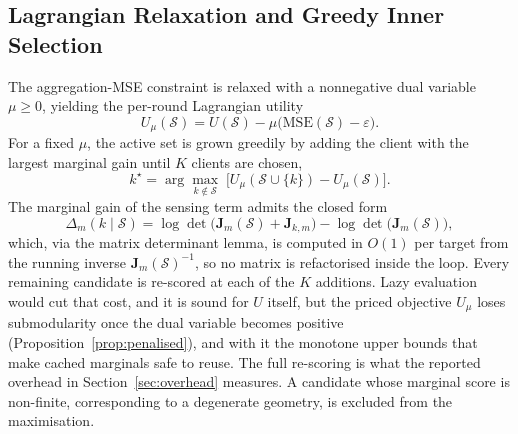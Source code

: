 \documentclass[lettersize,journal]{IEEEtran}
\newcommand{\bJ}{\bm{J}}
\newcommand{\calS}{\mathcal{S}}
\newcommand{\logdet}{\log\det}
\begin{document}
\subsection{Lagrangian Relaxation and Greedy Inner Selection}
The aggregation-MSE constraint is relaxed with a nonnegative dual variable $\mu\ge 0$, yielding the per-round Lagrangian utility
\begin{equation}
U_{\mu}(\calS)=U(\calS)-\mu\big(\mathrm{MSE}(\calS)-\varepsilon\big).
\label{eq:lagrangian}
\end{equation}
For a fixed $\mu$, the active set is grown greedily by adding the client with the largest marginal gain until $K$ clients are chosen,
\begin{equation}
k^\star=\arg\max_{k\notin\calS}\;\Big[U_{\mu}(\calS\cup\{k\})-U_{\mu}(\calS)\Big].
\label{eq:greedy}
\end{equation}
The marginal gain of the sensing term admits the closed form
\begin{equation}
\Delta_m(k\mid\calS)=\logdet\!\big(\bJ_m(\calS)+\bJ_{k,m}\big)-\logdet\!\big(\bJ_m(\calS)\big),
\end{equation}
which, via the matrix determinant lemma, is computed in $O(1)$ per target from the running inverse $\bJ_m(\calS)^{-1}$, so no matrix is refactorised inside the loop. Every remaining candidate is re-scored at each of the $K$ additions. Lazy evaluation~\cite{krause2014submodular} would cut that cost, and it is sound for $U$ itself, but the priced objective $U_\mu$ loses submodularity once the dual variable becomes positive (Proposition~\ref{prop:penalised}), and with it the monotone upper bounds that make cached marginals safe to reuse. The full re-scoring is what the reported overhead in Section~\ref{sec:overhead} measures. A candidate whose marginal score is non-finite, corresponding to a degenerate geometry, is excluded from the maximisation.
\end{document}
